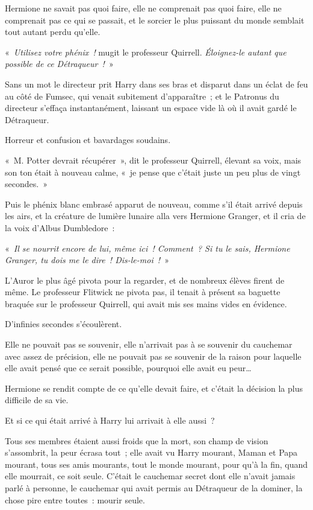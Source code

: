Hermione ne savait pas quoi faire, elle ne comprenait pas quoi faire, elle ne comprenait pas ce qui se passait, et le sorcier le plus puissant du monde semblait tout autant perdu qu'elle.

«~\emph{Utilisez votre phénix~!} mugit le professeur Quirrell.
\emph{Éloignez-le autant que possible de ce Détraqueur~!}~»

Sans un mot le directeur prit Harry dans ses bras et disparut dans un éclat de feu au côté de Fumsec, qui venait subitement d'apparaître~; et le Patronus du directeur s'effaça instantanément, laissant un espace vide là où il avait gardé le Détraqueur.

Horreur et confusion et bavardages soudains.

«~M. Potter devrait récupérer~», dit le professeur Quirrell, élevant sa voix, mais son ton était à nouveau calme, «~je pense que c'était juste un peu plus de vingt secondes.~»

Puis le phénix blanc embrasé apparut de nouveau, comme s'il était arrivé depuis les airs, et la créature de lumière lunaire alla vers Hermione Granger, et il cria de la voix d'Albus Dumbledore~:

«~\emph{Il se nourrit encore de lui, même ici~!
Comment~?
Si tu le sais, Hermione Granger, tu dois me le dire~!
Dis-le-moi~!}~»

L'Auror le plus âgé pivota pour la regarder, et de nombreux élèves firent de même.
Le professeur Flitwick ne pivota pas, il tenait à présent sa baguette braquée sur le professeur Quirrell, qui avait mis ses mains vides en évidence.

D'infinies secondes s'écoulèrent.

Elle ne pouvait pas se souvenir, elle n'arrivait pas à se souvenir du cauchemar avec assez de précision, elle ne pouvait pas se souvenir de la raison pour laquelle elle avait pensé que ce serait possible, pourquoi elle avait eu peur…

Hermione se rendit compte de ce qu'elle devait faire, et c'était la décision la plus difficile de sa vie.

Et si ce qui était arrivé à Harry lui arrivait à elle aussi~?

Tous ses membres étaient aussi froids que la mort, son champ de vision s'assombrit, la peur écrasa tout~; elle avait vu Harry mourant, Maman et Papa mourant, tous ses amis mourants, tout le monde mourant, pour qu'à la fin, quand elle mourrait, ce soit seule.
C'était le cauchemar secret dont elle n'avait jamais parlé à personne, le cauchemar qui avait permis au Détraqueur de la dominer, la chose pire entre toutes~: mourir seule.

